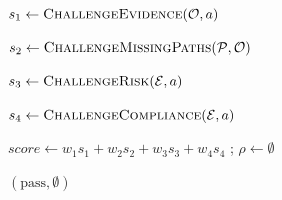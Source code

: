 \begin{algorithm}[t]
\caption{验证器挑战式验证 VerifierAdversarial}
\label{alg:verifier}
\DontPrintSemicolon
{}

$s_1 \leftarrow \textsc{ChallengeEvidence}(\mathcal{O}, a)$ \;

$s_2 \leftarrow \textsc{ChallengeMissingPaths}(\mathcal{P}, \mathcal{O})$ \;

$s_3 \leftarrow \textsc{ChallengeRisk}(\mathcal{E}, a)$ \;

$s_4 \leftarrow \textsc{ChallengeCompliance}(\mathcal{E}, a)$ \;

$score \leftarrow w_1 s_1 + w_2 s_2 + w_3 s_3 + w_4 s_4$ ;
$\rho \leftarrow \emptyset$ \;


\Return $(\text{pass}, \emptyset)$
\end{algorithm}
